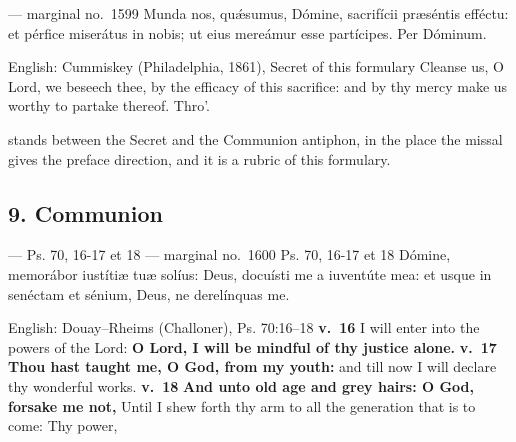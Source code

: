 \begin{appointedlatin}{ --- marginal no.\ 1599}
Munda nos, quǽsumus, Dómine, sacrifícii præséntis efféctu: et pérfice
miserátus in nobis; ut eius mereámur esse partícipes. Per Dóminum.
\end{appointedlatin}

\begin{namedtranslation}{English: Cummiskey (Philadelphia, 1861), Secret of this formulary}
Cleanse us, O Lord, we beseech thee, by the efficacy of this sacrifice: and by
thy mercy make us worthy to partake thereof. Thro'.
\end{namedtranslation}


 stands between the Secret and
the Communion antiphon, in the place the missal gives the preface direction,
and it is a rubric of this formulary.

\elementguard
\subsection*{9. Communion }

\begin{appointedlatin}{ --- Ps. 70, 16-17 et 18 --- marginal no.\ 1600}
\textnormal{Ps. 70, 16-17 et 18} Dómine, memorábor iustítiæ tuæ solíus: Deus,
docuísti me a iuventúte mea: et usque in senéctam et sénium, Deus, ne
derelínquas me.
\end{appointedlatin}

\begin{namedtranslation}{English: Douay--Rheims (Challoner), Ps. 70:16--18}
\textbf{v.~16} I will enter into the powers of the Lord: \textbf{O Lord, I will
be mindful of thy justice alone.} \textbf{v.~17} \textbf{Thou hast taught me, O
God, from my youth:} and till now I will declare thy wonderful works.
\textbf{v.~18} \textbf{And unto old age and grey hairs: O God, forsake me not,}
Until I shew forth thy arm to all the generation that is to come: Thy power,
\end{namedtranslation}

